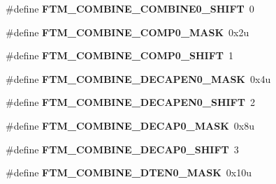 \begin{DoxyCompactItemize}
\item 
\#define {\bfseries F\+T\+M\+\_\+\+C\+O\+M\+B\+I\+N\+E\+\_\+\+C\+O\+M\+B\+I\+N\+E0\+\_\+\+S\+H\+I\+FT}~0\hypertarget{group__FTM__Register__Masks_gabe1e557f9bbddbbe13beac964fa07c1f}{}\label{group__FTM__Register__Masks_gabe1e557f9bbddbbe13beac964fa07c1f}

\item 
\#define {\bfseries F\+T\+M\+\_\+\+C\+O\+M\+B\+I\+N\+E\+\_\+\+C\+O\+M\+P0\+\_\+\+M\+A\+SK}~0x2u\hypertarget{group__FTM__Register__Masks_ga4ac7b3d3c5869c8c8af75bdc506e7c81}{}\label{group__FTM__Register__Masks_ga4ac7b3d3c5869c8c8af75bdc506e7c81}

\item 
\#define {\bfseries F\+T\+M\+\_\+\+C\+O\+M\+B\+I\+N\+E\+\_\+\+C\+O\+M\+P0\+\_\+\+S\+H\+I\+FT}~1\hypertarget{group__FTM__Register__Masks_ga26f836ae03a05f06608cefafb90082da}{}\label{group__FTM__Register__Masks_ga26f836ae03a05f06608cefafb90082da}

\item 
\#define {\bfseries F\+T\+M\+\_\+\+C\+O\+M\+B\+I\+N\+E\+\_\+\+D\+E\+C\+A\+P\+E\+N0\+\_\+\+M\+A\+SK}~0x4u\hypertarget{group__FTM__Register__Masks_ga77c4a4aae8406f791ebfbc82ba85b584}{}\label{group__FTM__Register__Masks_ga77c4a4aae8406f791ebfbc82ba85b584}

\item 
\#define {\bfseries F\+T\+M\+\_\+\+C\+O\+M\+B\+I\+N\+E\+\_\+\+D\+E\+C\+A\+P\+E\+N0\+\_\+\+S\+H\+I\+FT}~2\hypertarget{group__FTM__Register__Masks_ga5e5b2330d62feae3345f42df20e7f169}{}\label{group__FTM__Register__Masks_ga5e5b2330d62feae3345f42df20e7f169}

\item 
\#define {\bfseries F\+T\+M\+\_\+\+C\+O\+M\+B\+I\+N\+E\+\_\+\+D\+E\+C\+A\+P0\+\_\+\+M\+A\+SK}~0x8u\hypertarget{group__FTM__Register__Masks_ga9d79e8bd8bf1855adbe370ae1499d48d}{}\label{group__FTM__Register__Masks_ga9d79e8bd8bf1855adbe370ae1499d48d}

\item 
\#define {\bfseries F\+T\+M\+\_\+\+C\+O\+M\+B\+I\+N\+E\+\_\+\+D\+E\+C\+A\+P0\+\_\+\+S\+H\+I\+FT}~3\hypertarget{group__FTM__Register__Masks_ga4bfcf4d8cf838ad852c50cf589fd3d95}{}\label{group__FTM__Register__Masks_ga4bfcf4d8cf838ad852c50cf589fd3d95}

\item 
\#define {\bfseries F\+T\+M\+\_\+\+C\+O\+M\+B\+I\+N\+E\+\_\+\+D\+T\+E\+N0\+\_\+\+M\+A\+SK}~0x10u\hypertarget{group__FTM__Register__Masks_ga9722d2bdaba256dd90324aa6b199ee4f}{}\label{group__FTM__Register__Masks_ga9722d2bdaba256dd90324aa6b199ee4f}


\end{DoxyCompactItemize}
